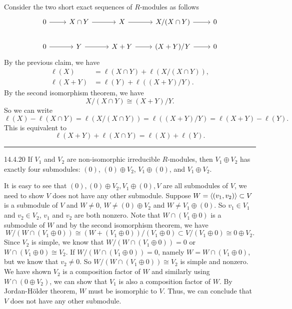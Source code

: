 \documentclass[a4paper, 12pt]{article}
\begin{document}
\begin{solution}
Consider the two short exact sequences of \(R\)-modules as follows 
\[\begin{tikzcd}
	0 & {X\cap Y} & X & {X/(X\cap Y)} & 0 \\
	0 & Y & {X+Y} & {(X+Y)/Y} & 0
	\arrow[from=1-1, to=1-2]
	\arrow[from=1-2, to=1-3]
	\arrow[from=1-3, to=1-4]
	\arrow[from=1-4, to=1-5]
	\arrow[from=2-1, to=2-2]
	\arrow[from=2-2, to=2-3]
	\arrow[from=2-3, to=2-4]
	\arrow[from=2-4, to=2-5]
\end{tikzcd}\]
By the previous claim, we have 
\begin{align*}
    \ell(X)&=\ell(X\cap Y)+\ell(X/(X\cap Y)),\\ 
    \ell(X+Y)&=\ell(Y)+\ell((X+Y)/Y).
\end{align*}
By the second isomorphism theorem, we have 
\[X/(X\cap Y)\cong (X+Y)/Y.\]
So we can write 
\[\ell(X)-\ell(X\cap Y)=\ell(X/(X\cap Y))=\ell((X+Y)/Y)=\ell(X+Y)-\ell(Y).\]
This is equivalent to 
\[\ell(X+Y)+\ell(X\cap Y)=\ell(X)+\ell(Y).\]
\end{solution}

\noindent\rule{7in}{2.8pt}
\begin{problem}{14.4.20}
If \(V_1\) and \(V_2\) are non-isomorphic irreducible \(R\)-modules, then \(V_1\oplus V_2\) has exactly four submodules: \((0)\), \((0)\oplus V_2\), \(V_1\oplus (0)\), and \(V_1\oplus V_2\). 
\end{problem}
\begin{solution}
It is easy to see that \((0),(0)\oplus V_2,V_1\oplus (0),V\) are all submodules of \(V\), we need to show \(V\) does not have any other submodule. Suppose \(W=\langle (v_1,v_2)\rangle\subset V\) is a submodule of \(V\) and \(W\neq 0\), \(W\neq (0)\oplus V_2\) and \(W\neq V_1\oplus (0)\).  
So \(v_1\in V_1\) and \(v_2\in V_2\), \(v_1\) and \(v_2\) are both nonzero. Note that \(W\cap (V_1\oplus 0)\) is a submodule of \(W\) and by the second isomorphism theorem, we have 
\[W/(W\cap (V_1\oplus 0))\cong (W+(V_1\oplus 0))/(V_1\oplus 0)\subset V/(V_1\oplus 0)\cong 0\oplus V_2.\]
Since \(V_2\) is simple, we know that \(W/(W\cap (V_1\oplus 0))=0\) or \(W\cap (V_1\oplus 0)\cong V_2\). If \(W/(W\cap (V_1\oplus 0))=0\), namely \(W=W\cap (V_1\oplus 0)\), but we know that \(v_2\neq 0\). So 
\(W/(W\cap (V_1\oplus 0))\cong V_2\) is simple and nonzero. We have shown \(V_2\) is a composition factor of \(W\) and similarly using \(W\cap (0\oplus V_2)\), we can show that \(V_1\) is also a composition factor of 
\(W\). By Jordan-H\"{o}lder theorem, \(W\) must be isomorphic to \(V\). Thus, we can conclude that \(V\) does not have any other submodule.
\end{solution}
\end{document}
